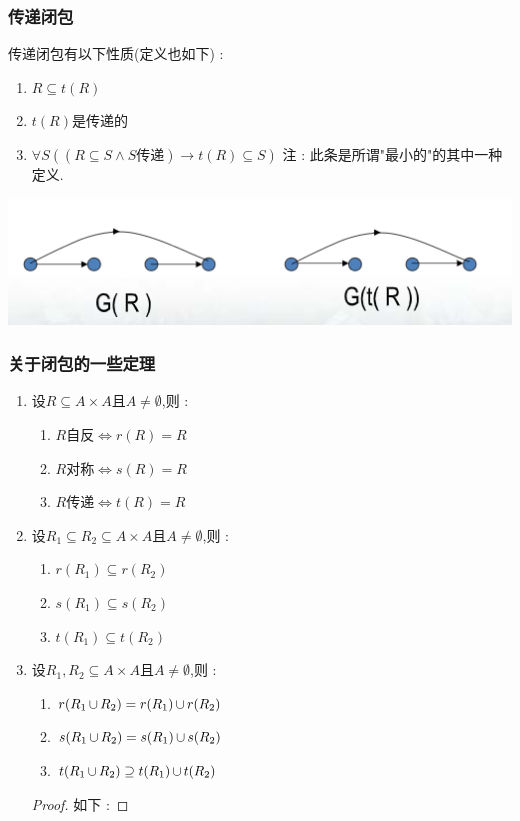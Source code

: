 {{\subsubsection{传递闭包}{
  传递闭包有以下性质(定义也如下) : \begin{enumerate}
    \item $R \subseteq t(R)$
    \item $t(R)$是传递的
    \item $\forall S ((R \subseteq S \land S\mbox{传递}) \to t(R) \subseteq S)$ 注 : 此条是所谓"最小的"的其中一种定义.
  \end{enumerate}

  \begin{center}
    \includegraphics{resources/transivity_closure.png}
  \end{center}
}%

\subsubsection{关于闭包的一些定理}{
  \begin{enumerate}
    \item {
          设$R \subseteq A \times A$且$A \neq \emptyset$,则 : \begin{enumerate}
            \item $R$自反$\Leftrightarrow r(R) = R$
            \item $R$对称$\Leftrightarrow s(R) = R$
            \item $R$传递$\Leftrightarrow t(R) = R$
          \end{enumerate}
          }
    \item {
          设$R_1 \subseteq R_2 \subseteq A \times A$且$A \neq \emptyset$,则 : \begin{enumerate}
            \item $r(R_1) \subseteq r(R_2)$
            \item $s(R_1) \subseteq s(R_2)$
            \item $t(R_1) \subseteq t(R_2)$
          \end{enumerate}
          }
    \item {
          设$R_1,R_2\subseteq A \times A$且$A \neq \emptyset$,则 : \begin{enumerate}
            \item $r(R_1 \operatorname{\cup} R_2) = r(R_1) \operatorname{\cup} r(R_2)$
            \item $s(R_1 \operatorname{\cup} R_2) = s(R_1) \operatorname{\cup} s(R_2)$
            \item $t(R_1 \operatorname{\cup} R_2) \supseteq t(R_1) \operatorname{\cup} t(R_2)$
          \end{enumerate}
          \begin{proof}
            如下 :


\end{proof}}
\end{enumerate}}}}
